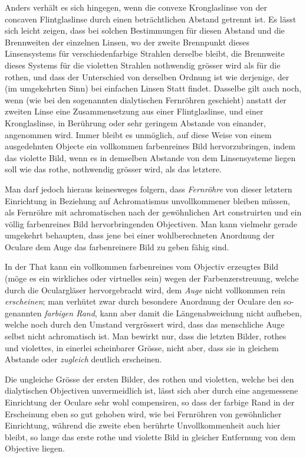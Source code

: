 \documentclass[11pt,a4paper]{article}
\begin{document}
Anders verhält es sich hingegen, wenn die convexe Kronglaslinse von der concaven Flintglaslinse durch einen beträchtlichen Abstand getrennt ist. Es lässt sich leicht zeigen, dass bei solchen Bestimmungen für diesen Abstand und die Brennweiten der einzelnen Linsen, wo der zweite Brennpunkt dieses Linsensystems für verschiedenfarbige Strahlen derselbe bleibt, die Brennweite dieses Systems für die violetten Strahlen nothwendig grösser wird als für die rothen, und dass der Unterschied von derselben Ordnung ist wie derjenige, der (im umgekehrten Sinn) bei einfachen Linsen Statt findet. Dasselbe gilt auch noch, wenn (wie bei den sogenannten dialytischen Fernröhren geschieht) anstatt der zweiten Linse eine Zusammensetzung aus einer Flintglaslinse, und einer Kronglaslinse, in Berührung oder sehr geringem Abstande von einander, angenommen wird. Immer bleibt es unmöglich, auf diese Weise von einem ausgedehnten Objecte ein vollkommen farbenreines Bild hervorzubringen, indem das violette Bild, wenn es in demselben Abstande von dem Linsensysteme liegen soll wie das rothe, nothwendig grösser wird, als das letztere.

Man darf jedoch hieraus keinesweges folgern, dass \textit{Fernröhre} von dieser letztern Einrichtung in Beziehung auf Achromatismus unvollkommener bleiben müssen, als Fernröhre mit achromatischen nach der gewöhnlichen Art construirten und ein völlig farbenreines Bild hervorbringenden Objectiven. Man kann vielmehr gerade umgekehrt behaupten, dass jene bei einer wohlberechneten Anordnung der Oculare dem Auge das farbenreinere Bild zu geben fähig sind.

In der That kann ein vollkommen farbenreines vom Objectiv erzeugtes Bild (möge es ein wirkliches oder virtuelles sein) wegen der Farbenzerstreuung, welche durch die Oculargläser hervorgebracht wird, dem \textit{Auge} nicht vollkommen rein \textit{erscheinen}; man verhütet zwar durch besondere Anordnung der Oculare den so-genannten \textit{farbigen Rand}, kann aber damit die Längenabweichung nicht aufheben, welche noch durch den Umstand vergrössert wird, dass das menschliche Auge selbst nicht achromatisch ist. Man bewirkt nur, dass die letzten Bilder, rothes und violettes, in einerlei scheinbarer Grösse, nicht aber, dass sie in gleichem Abstande oder \textit{zugleich} deutlich erscheinen.

Die ungleiche Grösse der ersten Bilder, des rothen und violetten, welche bei den dialytischen Objectiven unvermeidlich ist, lässt sich aber durch eine angemessene Einrichtung der Oculare sehr wohl compensiren, so dass der farbige Rand in der Erscheinung eben so gut gehoben wird, wie bei Fernröhren von gewöhnlicher Einrichtung, während die zweite eben berührte Unvollkommenheit auch hier bleibt, so lange das erste rothe und violette Bild in gleicher Entfernung von dem Objective liegen.
\end{document}
